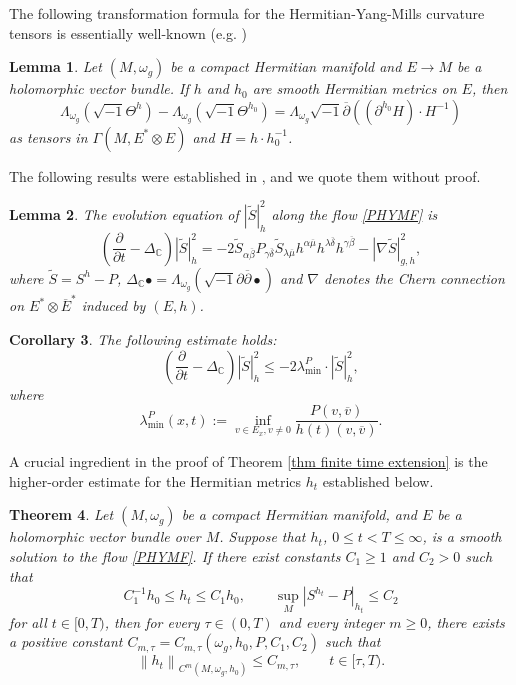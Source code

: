 \documentclass[12pt, reqno]{amsart}
\newcommand\bp{{\bar\partial}}
\theoremstyle{plain}
\newtheorem{thm}{Theorem}[section]
\newtheorem{lemma}[thm]{Lemma}
\newtheorem{cor}[thm]{Corollary}
\theoremstyle{definition}
\newcommand{\btheorem}{\begin{thm}}
\newcommand{\etheorem}{\end{thm}}
\newcommand{\bcorollary}{\begin{cor}}
\newcommand{\ecorollary}{\end{cor}}
\newcommand{\elemma}{\end{lemma}}
\newcommand{\blemma}{\begin{lemma}}
\newcommand{\sq}{\sqrt{-1}}
\newcommand{\p}{\partial}
\renewcommand{\bar}{\overline}
\newcommand{\beq}{\begin{equation}}
\newcommand{\eeq}{\end{equation}}
\renewcommand{\tilde}{\widetilde}
\renewcommand{\bp}{\bar{\partial}}
\newcommand{\ts}{\otimes}
\renewcommand{\>}{\rightarrow}
\newcommand{\C}{{\mathbb C}}
\renewcommand{\>}{\rightarrow}
\renewcommand{\p}{{\partial}}
\renewcommand{\bp}{{\bar{\partial}}}
\renewcommand{\bar}{\overline}
\renewcommand{\tilde}{\widetilde}
\newcommand{\smo}{\sqrt{-1}}
\numberwithin{equation}{section} %
\begin{document}
\noindent The following transformation formula for the
Hermitian-Yang-Mills curvature tensors is essentially well-known
(e.g. \cite[Proposition~3.6]{WYY26+})
\blemma\label{lem Theta formula} Let $(M,\omega_g)$ be
a compact  Hermitian manifold and $E\>M$ be a holomorphic vector
bundle. If $h$ and $h_0$ are smooth Hermitian metrics on $E$, then
\beq \Lambda_{\omega_g}\left(\sq  \Theta^{h}\right)-
\Lambda_{\omega_g}\left(\sq  \Theta^{h_0}\right)=
\Lambda_{\omega_g}\smo\bp\left( (\p^{h_0} H) \cdot H^{-1}
\right)\label{conformalchange1} \eeq as tensors in $\Gamma(M,E^*\ts
E)$ and $H=h\cdot h_0^{-1}$.
\elemma
 The following results were established in \cite[Section~2]{XYY26+}, and we quote them without proof.
\blemma\label{lem tilde S evolution}The evolution equation of $|\tilde S|^2_h$ along the flow \eqref{PHYMF} is
\beq
\left(\frac{\p }{\p t}-\Delta_\C \right)|\tilde S|_{h}^2
=-2\tilde S_{\alpha\bar\beta}  P_{\gamma\bar\delta}\tilde S_{\lambda\bar \mu} h^{\alpha\bar \mu}  h^{\lambda \bar \delta} h^{\gamma\bar\beta}
- \left|\nabla \tilde S\right|_{g,h}^2,
\label{tilde S evolution}
\eeq
where $\tilde S =S^h-P$, $\Delta_{\C}\bullet =\Lambda_{\omega_g}\left(\sq \p\bp \bullet\right) $ and  $\nabla$ denotes the Chern connection on $E^*\ts \bar E^*$ induced by $(E,h)$.
\elemma


\bcorollary\label{cor tilde S inequality} The following estimate holds:
\beq
\left(\frac{\p }{\p t}-\Delta_\C \right)|\tilde S|_{h}^2 \leq -2 \lambda^P_{\min}\cdot |\tilde S|_{h}^2,
\eeq
where
\beq \lambda^P_{\min}(x,t):=\inf_{v \in E_x, v\neq 0}  \frac{ P(v, \bar v) }{h(t)(v,\bar v)}.\eeq

\ecorollary



\noindent A crucial ingredient in the proof of Theorem \ref{thm finite time extension} is the higher-order estimate for the Hermitian metrics $h_t$ established below.

\btheorem\label{parabolicbootstrap}
Let $(M,\omega_g)$ be a compact Hermitian manifold, and $E$ be a holomorphic vector bundle over $M$.
Suppose that  $h_t$, $0\leq t<T\leq \infty$, is a smooth solution to the flow \eqref{PHYMF}. If there exist constants $C_1\geq 1$ and $C_2>0$ such that
\beq
C_1^{-1}h_0\leq h_t\leq C_1h_0,
\qquad
\sup_M\left|S^{h_t}-P\right|_{h_t}\leq C_2
\eeq
for all $t\in[0,T)$, then for every $\tau\in (0, T)$ and every integer $m\geq 0$, there exists a positive constant $C_{m,\tau}=C_{m,\tau}(\omega_g,h_0,P,C_1,C_2)$ such that
\beq
\left\|h_t\right\|_{C^{m}(M,\omega_g, h_0)}\leq C_{m,\tau},
\qquad t\in[\tau,T).
\label{uniform parabolic bootstrapping estimate}
\eeq
\etheorem
\end{document}
